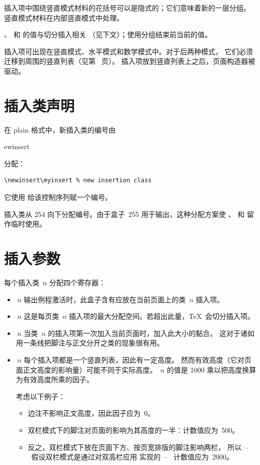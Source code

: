 \documentclass[a4paper]{rapport3}
\makeatletter
\def\ldash{\unskip\ --\nobreak\ \ignorespaces}
\def\rdash{\unskip\nobreak\ --\ \ignorespaces}
\def\cstoidx#1\par{\index{#1@\cs{#1}}}
\def\csidx#1{\cstoidx #1\par\cs{#1}}
\makeatother
\begin{document}
插入项中围绕竖直模式材料的花括号可以是隐式的；它们意味着新的一层分组。
竖直模式材料在内部竖直模式中处理。

、 和  的值与切分插入相关
（见下文）；使用分组结束前当前的值。

插入项可出现在竖直模式、水平模式和数学模式中。对于后两种模式，
它们必须迁移到周围的竖直列表（见第~\pageref{migrate} 页）。
插入项放到竖直列表上之后，页面构造器被驱动。


\section{插入类声明}

在 plain 格式中，新插入类的编号由 \csidx{newinsert} 分配：
\begin{verbatim}
\newinsert\myinsert % new insertion class
\end{verbatim}
它使用  给该控制序列赋一个编号。

插入类从 254 向下分配编号。由于盒子~255 用于输出，这种分配方案使
、 和  留作临时使用。

\section{插入参数}

每个插入类~$n$ 分配四个寄存器：
\begin{itemize}
\item {}$\,n$ 输出例程激活时，此盒子含有应放在当前页面上的类~$n$ 插入项。
\item {}$\,n$ 这是每页类~$n$ 插入项的最大分配空间。若超出此量，\TeX\ 会切分插入项。
\item {}$\,n$ 当类~$n$ 的插入项第一次加入当前页面时，加入此大小的黏合。
      这对于诸如用一条线把脚注与正文分开之类的现象很有用。
\item {}$\,n$ 每个插入项都是一个竖直列表，因此有一定高度。
      然而有效高度（它对页面正文高度的影响量）可能不同于实际高度。
      $\,n$ 的值是 1000 乘以把高度换算为有效高度所乘的因子。

      考虑以下例子：
      \begin{itemize}\item 边注不影响正文高度，因此因子应为~0。
      \item 双栏模式下的脚注对页面的影响为其高度的一半：计数值应为~500。
      \item 反之，双栏模式下放在页面下方、按页宽排版的脚注影响两栏，
      所以\ldash 假设双栏模式是通过对双高栏应用  实现的\rdash
      计数值应为~2000。\end{itemize}
\end{itemize}
\end{document}
